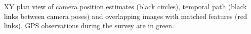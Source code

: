 \label{fig:real_spiral} XY plan view of camera position estimates (black circles), temporal path (black links between camera poses) and overlapping images with matched features (red links). GPS observations during the survey are in green.
  